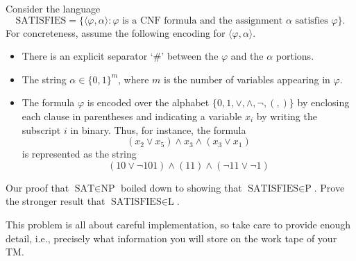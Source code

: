 \documentclass[12pt]{article}
\begin{document}


\begin{problem}{3}
    Consider the language 
    \[
    \text{SATISFIES} = \{\langle \varphi, \alpha \rangle : \varphi \text{ is a CNF formula and the assignment } \alpha \text{ satisfies } \varphi\}.
    \]
    For concreteness, assume the following encoding for $\langle \varphi, \alpha \rangle$.
    \begin{itemize}
        \item There is an explicit separator `\#' between the $\varphi$ and the $\alpha$ portions.
        \item The string $\alpha \in \{0,1\}^m$, where $m$ is the number of variables appearing in $\varphi$.
        \item The formula $\varphi$ is encoded over the alphabet $\{0,1,\lor,\land,\lnot,(,)\}$ by enclosing each clause in parentheses and indicating a variable $x_i$ by writing the subscript $i$ in binary. Thus, for instance, the formula
        \[ (x_2 \lor x_5) \land x_3 \land (x_3 \lor x_1) \]
        is represented as the string
        \[(10 \lor \lnot 101) \land (11) \land (\lnot 11 \lor \lnot 1)\]
    \end{itemize}

    Our proof that $\text{SAT} \in \text{NP}$ boiled down to showing that $\text{SATISFIES} \in \text{P}$. Prove the stronger result that $\text{SATISFIES} \in \text{L}$.

    This problem is all about careful implementation, so take care to provide enough detail, i.e., precisely what information you will store on the work tape of your TM.
\end{problem}
\end{document}
